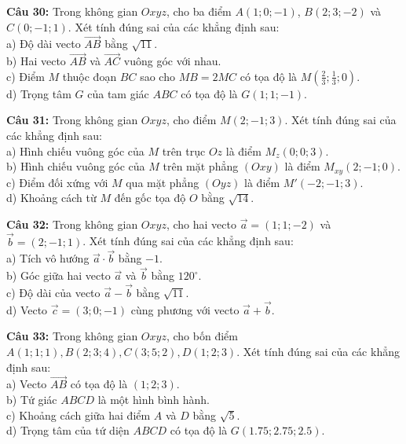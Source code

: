 \documentclass[12pt]{article}
\begin{document}
	\vspace{4mm}
	\noindent \textbf{Câu 30:} Trong không gian $Oxyz$, cho ba điểm $A(1; 0; -1)$, $B(2; 3; -2)$ và $C(0; -1; 1)$. Xét tính đúng sai của các khẳng định sau: \\
	\noindent a) Độ dài vecto $\vec{AB}$ bằng $\sqrt{11}$. \\
	\noindent b) Hai vecto $\vec{AB}$ và $\vec{AC}$ vuông góc với nhau. \\
	\noindent c) Điểm $M$ thuộc đoạn $BC$ sao cho $MB = 2MC$ có tọa độ là $M\left(\frac{2}{3}; \frac{1}{3}; 0\right)$. \\
	\noindent d) Trọng tâm $G$ của tam giác $ABC$ có tọa độ là $G(1; 1; -1)$.
	
	\vspace{4mm}
	\noindent \textbf{Câu 31:} Trong không gian $Oxyz$, cho điểm $M(2; -1; 3)$. Xét tính đúng sai của các khẳng định sau: \\
	\noindent a) Hình chiếu vuông góc của $M$ trên trục $Oz$ là điểm $M_z(0; 0; 3)$. \\
	\noindent b) Hình chiếu vuông góc của $M$ trên mặt phẳng $(Oxy)$ là điểm $M_{xy}(2; -1; 0)$. \\
	\noindent c) Điểm đối xứng với $M$ qua mặt phẳng $(Oyz)$ là điểm $M'(-2; -1; 3)$. \\
	\noindent d) Khoảng cách từ $M$ đến gốc tọa độ $O$ bằng $\sqrt{14}$.
	
	\vspace{4mm}
	\noindent \textbf{Câu 32:} Trong không gian $Oxyz$, cho hai vecto $\vec{a} = (1; 1; -2)$ và $\vec{b} = (2; -1; 1)$. Xét tính đúng sai của các khẳng định sau: \\
	\noindent a) Tích vô hướng $\vec{a} \cdot \vec{b}$ bằng $-1$. \\
	\noindent b) Góc giữa hai vecto $\vec{a}$ và $\vec{b}$ bằng $120^\circ$. \\
	\noindent c) Độ dài của vecto $\vec{a} - \vec{b}$ bằng $\sqrt{11}$. \\
	\noindent d) Vecto $\vec{c} = (3; 0; -1)$ cùng phương với vecto $\vec{a} + \vec{b}$.
	
	\vspace{4mm}
	\noindent \textbf{Câu 33:} Trong không gian $Oxyz$, cho bốn điểm $A(1; 1; 1), B(2; 3; 4), C(3; 5; 2), D(1; 2; 3)$. Xét tính đúng sai của các khẳng định sau: \\
	\noindent a) Vecto $\vec{AB}$ có tọa độ là $(1; 2; 3)$. \\
	\noindent b) Tứ giác $ABCD$ là một hình bình hành. \\
	\noindent c) Khoảng cách giữa hai điểm $A$ và $D$ bằng $\sqrt{5}$. \\
	\noindent d) Trọng tâm của tứ diện $ABCD$ có tọa độ là $G(1.75; 2.75; 2.5)$.
	
\end{document}
